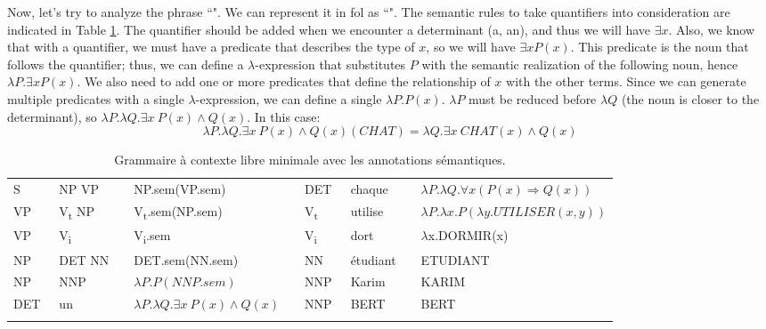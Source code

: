 \documentclass{KBook}
\begin{document}
Now, let's try to analyze the phrase ``".
We can represent it in \ac{fol} as ``".
The semantic rules to take quantifiers into consideration are indicated in Table \ref{tab:regles-sem2}. 
The quantifier should be added when we encounter a determinant (a, an), and thus we will have $\exists x$. 
Also, we know that with a quantifier, we must have a predicate that describes the type of $x$, so we will have $\exists x P(x)$.
This predicate is the noun that follows the quantifier; thus, we can define a $\lambda $-expression that substitutes $P$ with the semantic realization of the following noun, hence $\lambda P.\exists x P(x)$.
We also need to add one or more predicates that define the relationship of $x$ with the other terms. 
Since we can generate multiple predicates with a single $\lambda $-expression, we can define a single $\lambda P.P(x)$.
$\lambda P$ must be reduced before $\lambda Q$ (the noun is closer to the determinant), so $\lambda P.\lambda Q.\exists x\ P(x) \wedge Q(x)$. 
In this case: 
\[\lambda P.\lambda Q.\exists x\ P(x) \wedge Q(x)(CHAT) = \lambda Q.\exists x\ CHAT(x) \wedge Q(x)\]


\begin{table}[ht]
	\centering
	\begin{tabular}{lllllllll}
		\cline{1-4}\cline{6-9}\noalign{\vskip\doublerulesep
			\vskip-\arrayrulewidth}\cline{1-4}\cline{6-9}
		S  & \textrightarrow\ NP VP && NP.sem(VP.sem) &&
		DET & \textrightarrow\ chaque && $\lambda P.\lambda Q.\forall x (P(x) \Rightarrow Q(x))$ \\
		
		VP & \textrightarrow\ V\textsubscript{t} NP && V\textsubscript{t}.sem(NP.sem) &&
		V\textsubscript{t}  & \textrightarrow\ utilise && $\lambda P.\lambda x.P(\lambda y.UTILISER(x, y))$ \\
		
		VP & \textrightarrow\ V\textsubscript{i} && V\textsubscript{i}.sem &&
		V\textsubscript{i}  & \textrightarrow\ dort && $ \lambda $x.DORMIR(x) \\
		
		NP & \textrightarrow\ DET NN && DET.sem(NN.sem)  &&
		NN  & \textrightarrow\  étudiant && ETUDIANT \\
		
		NP & \textrightarrow\ NNP && $\lambda P.P(NNP.sem)$  &&
		NNP  & \textrightarrow\  Karim && KARIM \\
		
		DET & \textrightarrow\ un && $\lambda P.\lambda Q.\exists x\ P(x) \wedge Q(x)$  &&
		NNP  & \textrightarrow\  BERT && BERT \\
		\cline{1-4}\cline{6-9}\noalign{\vskip\doublerulesep
			\vskip-\arrayrulewidth}\cline{1-4}\cline{6-9}
	\end{tabular}
	\caption{Grammaire à contexte libre minimale avec les annotations sémantiques.}
	\label{tab:regles-sem2}
\end{table}
\end{document}
